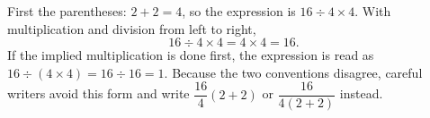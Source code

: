 First the parentheses: $2+2=4$, so the expression is $16\div4\times4$. With multiplication and division from left to right,
\[
16\div4\times4=4\times4=\boxed{16}.
\]
If the implied multiplication is done first, the expression is read as $16\div(4\times4)=16\div16=\boxed{1}$. Because the two conventions disagree, careful writers avoid this form and write $\dfrac{16}{4}(2+2)$ or $\dfrac{16}{4(2+2)}$ instead.
